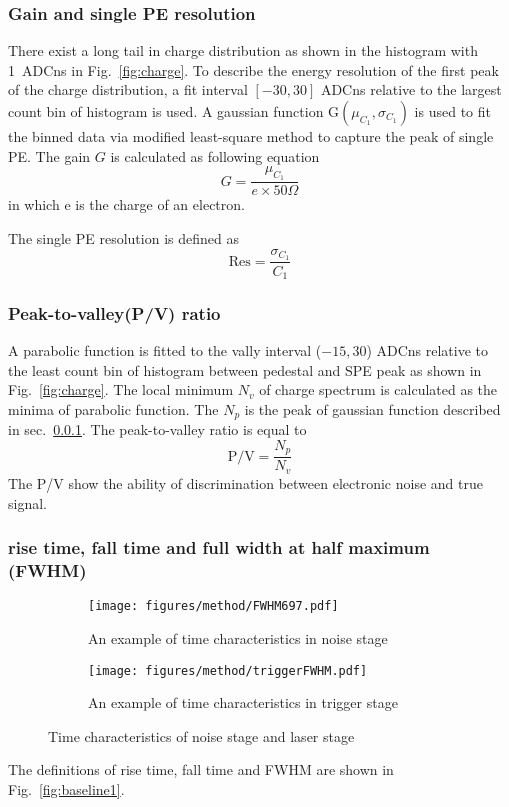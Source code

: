 \subsubsection{Gain and single PE resolution}
\label{sec:noisegain}
There exist a long tail in charge distribution as shown in the histogram with \SI{1}{ADCns} in Fig.~\ref{fig:charge}. To describe the energy resolution of the first peak of the charge distribution, a fit interval $[-30, 30]$ ADCns relative to the largest count bin of histogram is used. A gaussian function G$(\mu_{C_1},\sigma_{C_1})$ is used to fit the binned data via modified least-square method to capture the peak of single PE. The gain $G$ is calculated as following equation
\begin{equation}
    G=\frac{\mu_{C_1}}{e\times 50\Omega}
\end{equation}
in which e is the charge of an electron.

The single PE resolution is defined as
\begin{equation}
    \mathrm{Res}=\frac{\sigma_{C_1}}{C_1}
\end{equation}
\subsubsection{Peak-to-valley(P/V) ratio}
A parabolic function is fitted to the vally interval ($-15, 30$) ADCns relative to the least count bin of histogram between pedestal and SPE peak as shown in Fig.~\ref{fig:charge}. The local minimum $N_v$ of charge spectrum is calculated as the minima of parabolic function. The $N_p$ is the peak of gaussian function described in sec.~\ref{sec:noisegain}. The peak-to-valley ratio is equal to  
\begin{equation}
    \mathrm{P/V}=\frac{N_p}{N_v}
\end{equation}
The P/V show the ability of discrimination between electronic noise and true signal.
\subsubsection{rise time, fall time and full width at half maximum (FWHM)}
\begin{figure}[!htbp]
    \centering
    \begin{subfigure}[t]{0.47\textwidth}
        \texttt{[image: figures/method/FWHM697.pdf]}
        \caption{An example of time characteristics in noise stage}
        \label{fig:risefallFWHM}
    \end{subfigure}
    \begin{subfigure}[t]{0.47\textwidth}
        \texttt{[image: figures/method/triggerFWHM.pdf]}
        \caption{An example of time characteristics in trigger stage}
        \label{fig:triggerFWHM}
    \end{subfigure}
    \caption{Time characteristics of noise stage and laser stage}
\end{figure}
The definitions of rise time, fall time and FWHM are shown in Fig.~\ref{fig:baseline1}. 

